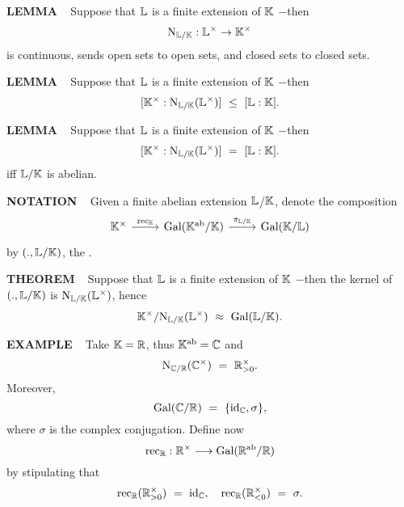 \begin{x}{\small\bf LEMMA} \ %
Suppose that $\mathbb{L}$ is a finite extension of $\mathbb{K}$ $-$then
\[
\text{N}_{\mathbb{L}/\mathbb{K}}: \mathbb{L}^\times  \rightarrow \mathbb{K}^\times
\]
is continuous, sends open sets to open sets, and closed sets to closed sets.
\end{x}

\vspace{0.1cm}


\begin{x}{\small\bf LEMMA} \ %
Suppose that $\mathbb{L}$ is a finite extension of $\mathbb{K}$ $-$then 
\[
[\K^\times : \tN_{\LL/\K} (\LL^\times)] \ \leq \ [\LL:\K].
\]
\end{x}

\vspace{0.1cm}

\begin{x}{\small\bf LEMMA} \ %
Suppose that $\mathbb{L}$ is a finite extension of $\mathbb{K}$ $-$then 
\[
[\mathbb{K}^\times : \text{N}_{\mathbb{L}/\mathbb{K}} (\mathbb{L}^\times)] \ = \ [\mathbb{L}:\mathbb{K}].
\]
iff $\mathbb{L} / \mathbb{K}$ is abelian.
\end{x}

\vspace{0.1cm}

\begin{x}{\small\bf NOTATION} \ %
Given a finite abelian extension $\mathbb{L}$/$\mathbb{K}$, denote the composition 
\[
\begin{tikzcd}[sep=small]
{\K^\times} \ar{rr}{\rec_\K} &&{\Gal(\K^\ab/\K)} \ar{rr}{\pi_{\LL/\K}} &&{\Gal(\K/\LL)}
\end{tikzcd}
\]
by $(.,\mathbb{L}/\mathbb{K})$, the 
.
\end{x}

\vspace{0.1cm}

\begin{x}{\small\bf THEOREM} \ %
Suppose that $\mathbb{L}$ is a finite extension of $\mathbb{K}$ $-$then the kernel of $(.,\mathbb{L}/\mathbb{K})$ is 
$\text{N}_{\mathbb{L}/\mathbb{K}}(\mathbb{L}^\times)$, hence 
\[
\K^\times / \tN_{\LL/\K}(\LL^\times) \ \approx \ \Gal(\LL/\K).
\]
\end{x}
\vspace{0.1cm}

\begin{x}{\small\bf EXAMPLE} \ %
Take $\mathbb{K} = \mathbb{R}$, thus $\mathbb{K}^{\text{ab}} = \mathbb{C}$ and 
\[
\text{N}_{\mathbb{C}/\mathbb{R}}(\mathbb{C}^\times) \ = \ \mathbb{R}_{> 0}^\times.
\]
Moreover, 
\[
\Gal(\C/\R) \ = \ \{\id_\C,\sigma\},
\]
where $\sigma$ is the complex conjugation.  
Define now
\[
\text{rec}_{\mathbb{R}}:\mathbb{R}^\times \longrightarrow \text{Gal}(\mathbb{R}^{\text{ab}} / \mathbb{R})
\]
by stipulating that
\[
\rec_\R(\R_{> 0}^\times) \ = \ \id_\C, \quad \rec_\R(\R_{< 0}^\times) \ = \ \sigma.
\]
\end{x}

